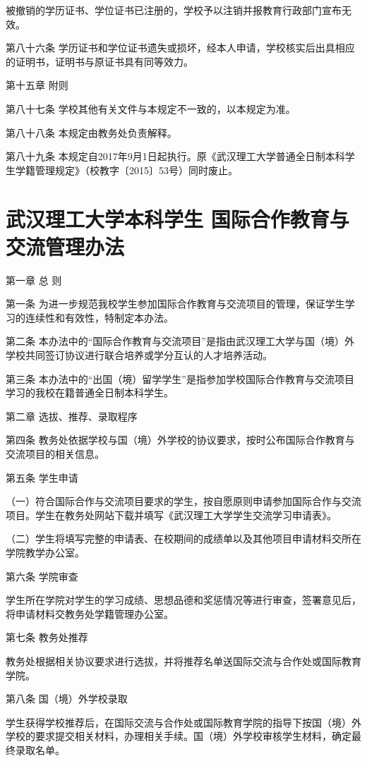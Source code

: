 \documentclass[UTF8,12pt,a4paper]{report}
\begin{document}
被撤销的学历证书、学位证书已注册的，学校予以注销并报教育行政部门宣布无效。

第八十六条  学历证书和学位证书遗失或损坏，经本人申请，学校核实后出具相应的证明书，证明书与原证书具有同等效力。



第十五章  附则

第八十七条  学校其他有关文件与本规定不一致的，以本规定为准。

第八十八条  本规定由教务处负责解释。

第八十九条  本规定自2017年9月1日起执行。原《武汉理工大学普通全日制本科学生学籍管理规定》（校教字〔2015〕53号）同时废止。

\chapter{武汉理工大学本科学生 国际合作教育与交流管理办法}
第一章 总 则

第一条 为进一步规范我校学生参加国际合作教育与交流项目的管理，保证学生学习的连续性和有效性，特制定本办法。

第二条 本办法中的“国际合作教育与交流项目”是指由武汉理工大学与国（境）外学校共同签订协议进行联合培养或学分互认的人才培养活动。

第三条 本办法中的“出国（境）留学学生”是指参加学校国际合作教育与交流项目学习的我校在籍普通全日制本科学生。

第二章 选拔、推荐、录取程序

第四条 教务处依据学校与国（境）外学校的协议要求，按时公布国际合作教育与交流项目的相关信息。

第五条 学生申请

（一）符合国际合作与交流项目要求的学生，按自愿原则申请参加国际合作与交流项目。学生在教务处网站下载并填写《武汉理工大学学生交流学习申请表》。

（二）学生将填写完整的申请表、在校期间的成绩单以及其他项目申请材料交所在学院教学办公室。

第六条 学院审查

学生所在学院对学生的学习成绩、思想品德和奖惩情况等进行审查，签署意见后，将申请材料交教务处学籍管理办公室。

第七条 教务处推荐

教务处根据相关协议要求进行选拔，并将推荐名单送国际交流与合作处或国际教育学院。

第八条 国（境）外学校录取

学生获得学校推荐后，在国际交流与合作处或国际教育学院的指导下按国（境）外学校的要求提交相关材料，办理相关手续。国（境）外学校审核学生材料，确定最终录取名单。
\end{document}
